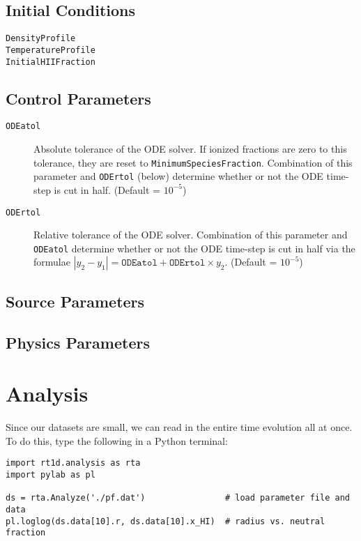 \documentclass[letterpaper,titlepage,12pt]{article}
\numberwithin{equation}{section}
\begin{document}
\subsection{Initial Conditions}
\begin{description}
    
\item [\texttt{DensityProfile}]  

\item [\texttt{TemperatureProfile}]

\item [\texttt{InitialHIIFraction}]  

\end{description}


\subsection{Control Parameters}

\begin{description}
    
\item [\texttt{ODEatol}] Absolute tolerance of the ODE solver.  If ionized fractions are zero to this tolerance, they are reset to \texttt{MinimumSpeciesFraction}.  Combination of this parameter and \texttt{ODErtol} (below) determine whether or not the ODE time-step is cut in half. (Default = $10^{-5}$)

\item [\texttt{ODErtol}]
Relative tolerance of the ODE solver.  Combination of this parameter and \texttt{ODEatol} determine whether or not the ODE time-step is cut in half via the formulae $|y_2 - y_1| = \texttt{ODEatol} + \texttt{ODErtol}\times y_2$. (Default = $10^{-5}$)
 

\end{description}


\subsection{Source Parameters}


\subsection{Physics Parameters}


\section{Analysis}
Since our datasets are small, we can read in the entire time evolution all at once.  To do this, type the following in a Python terminal:
\begin{verbatim}
import rt1d.analysis as rta
import pylab as pl

ds = rta.Analyze('./pf.dat')                # load parameter file and data
pl.loglog(ds.data[10].r, ds.data[10].x_HI)  # radius vs. neutral fraction
\end{verbatim}
\end{document}
